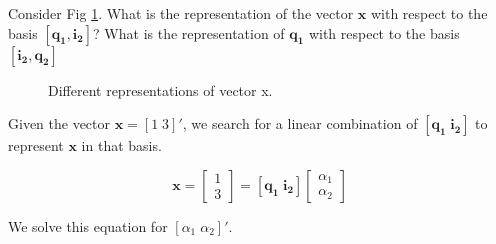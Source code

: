 \item [3.1] Consider Fig \ref{fig: basis}.
What is the representation of the vector $\mathbf{x}$  with
respect to the basis $[\mathbf{q_1}, \mathbf{i_2}]$?
What is the representation of $\mathbf{q_1}$ with respect to
the basis $[\mathbf{i_2}, \mathbf{q_2}]$

\begin{figure}[htb!]
\centering
{}

 \caption{Different representations of vector x.}
 \label{fig: basis}
\end{figure}


Given the vector $\mathbf{x} = [1 \; 3]'$, we search for a
linear combination of $[ \mathbf{q_1} \; \mathbf{i_2} ]$
to represent $\mathbf{x}$ in that basis.

\begin{equation*}
 \mathbf{x} = \begin{bmatrix}
                1\\3
               \end{bmatrix}
            = [\mathbf{q_1} \; \mathbf{i_2} ] \begin{bmatrix}
                                                \alpha_1 \\ \alpha_2
                                               \end{bmatrix}
\end{equation*}

We solve this equation for $[\alpha_1 \; \alpha_2]'$.


